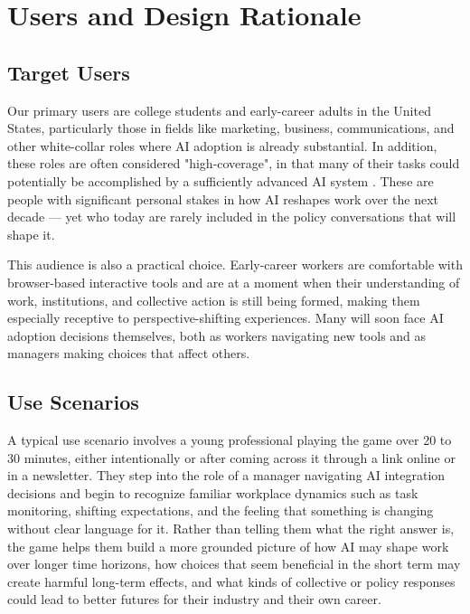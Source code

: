 \documentclass[sigconf,authordraft]{acmart}
\begin{document}
\section{Users and Design Rationale}


\subsection{Target Users}

Our primary users are college students and early-career adults in the United States, particularly those in fields like marketing, business, communications, and other white-collar roles where AI adoption is already substantial. In addition, these roles are often considered "high-coverage", in that many of their tasks could potentially be accomplished by a sufficiently advanced AI system \cite{mckinsey2025state}. These are people with significant personal stakes in how AI reshapes work over the next decade — yet who today are rarely included in the policy conversations that will shape it.

This audience is also a practical choice. Early-career workers are comfortable with browser-based interactive tools and are at a moment when their understanding of work, institutions, and collective action is still being formed, making them especially receptive to perspective-shifting experiences. Many will soon face AI adoption decisions themselves, both as workers navigating new tools and as managers making choices that affect others.

\subsection{Use Scenarios}

A typical use scenario involves a young professional playing the game over 20 to 30 minutes, either intentionally or after coming across it through a link online or in a newsletter. They step into the role of a manager navigating AI integration decisions and begin to recognize familiar workplace dynamics such as task monitoring, shifting expectations, and the feeling that something is changing without clear language for it. Rather than telling them what the right answer is, the game helps them build a more grounded picture of how AI may shape work over longer time horizons, how choices that seem beneficial in the short term may create harmful long-term effects, and what kinds of collective or policy responses could lead to better futures for their industry and their own career.
\end{document}
